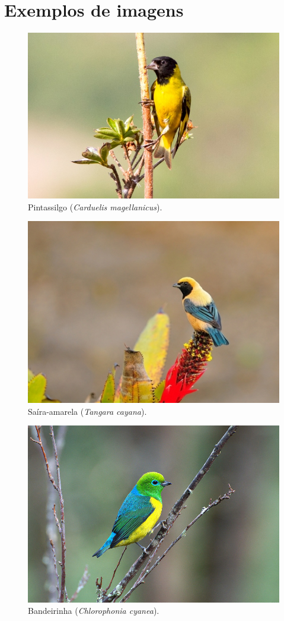 \documentclass[a5paper]{memoir}
\begin{document}
\chapter{Exemplos de imagens}
\lipsum[1-5]

\begin{figure}
\centering
\includegraphics[width=0.6\linewidth]{pintassilgo}
\caption{Pintassilgo (\textit{Carduelis magellanicus}).}
\label{fig:pintassilgo}
\end{figure}


\begin{figure}
\centering
\includegraphics[width=0.6\linewidth]{saira-amarela}
\caption{Saíra-amarela (\textit{Tangara cayana}).}
\label{fig:saira-amarela}
\end{figure}

\begin{figure}
\centering
\includegraphics[width=0.6\linewidth]{bandeirinha}
\caption{Bandeirinha (\textit{Chlorophonia cyanea}).}
\label{fig:bandeirinha}
\end{figure}
\end{document}
